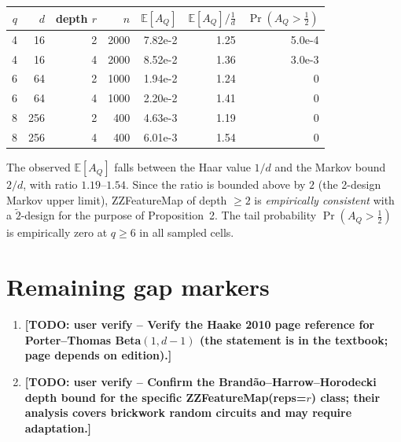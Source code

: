 \documentclass[11pt,a4paper]{article}
\newcommand{\E}{\mathbb{E}}
\newcommand{\TODO}[1]{\textbf{[TODO: user verify -- #1]}}
\begin{document}
\begin{center}
\small
\begin{tabular}{rrrrrrr}\toprule
$q$ & $d$ & depth $r$ & $n$ & $\E[A_Q]$ & $\E[A_Q]/\frac{1}{d}$ & $\Pr(A_Q{>}\tfrac12)$ \\
\midrule
4 & 16  & 2 & 2000 & 7.82e-2 & 1.25 & 5.0e-4 \\
4 & 16  & 4 & 2000 & 8.52e-2 & 1.36 & 3.0e-3 \\
6 & 64  & 2 & 1000 & 1.94e-2 & 1.24 & 0 \\
6 & 64  & 4 & 1000 & 2.20e-2 & 1.41 & 0 \\
8 & 256 & 2 &  400 & 4.63e-3 & 1.19 & 0 \\
8 & 256 & 4 &  400 & 6.01e-3 & 1.54 & 0 \\
\bottomrule
\end{tabular}
\end{center}

The observed $\E[A_Q]$ falls between the Haar value $1/d$ and the
Markov bound $2/d$, with ratio $1.19$--$1.54$.  Since the ratio is
bounded above by $2$ (the 2-design Markov upper limit), ZZFeatureMap
of depth $\ge 2$ is \emph{empirically consistent} with a $\tilde
2$-design for the purpose of Proposition~2.  The tail probability
$\Pr(A_Q>\tfrac12)$ is empirically zero at $q\ge 6$ in all sampled
cells.

\section{Remaining gap markers}

\begin{enumerate}
\item \TODO{Verify the Haake 2010 page reference for Porter--Thomas
  Beta$(1,d-1)$ (the statement is in the textbook; page depends on
  edition).}
\item \TODO{Confirm the Brand\~ao--Harrow--Horodecki depth bound for
  the specific ZZFeatureMap(reps=$r$) class; their analysis covers
  brickwork random circuits and may require adaptation.}
\end{enumerate}
\end{document}
